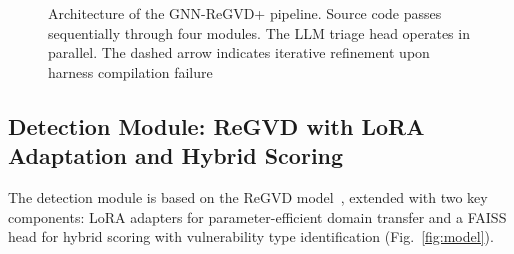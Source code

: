 \documentclass[runningheads]{llncs}
\begin{document}
\begin{figure}
{%
}
\caption{Architecture of the GNN-ReGVD+ pipeline. Source code passes sequentially through four modules. The LLM triage head operates in parallel. The dashed arrow indicates iterative refinement upon harness compilation failure}
\label{fig:pipeline}
\end{figure}

\subsection{Detection Module: ReGVD with LoRA Adaptation and Hybrid Scoring}

The detection module is based on the ReGVD model~\cite{nguyen2022regvd}, extended with two key components: LoRA adapters for parameter-efficient domain transfer and a FAISS head for hybrid scoring with vulnerability type identification (Fig.~\ref{fig:model}).
\end{document}
